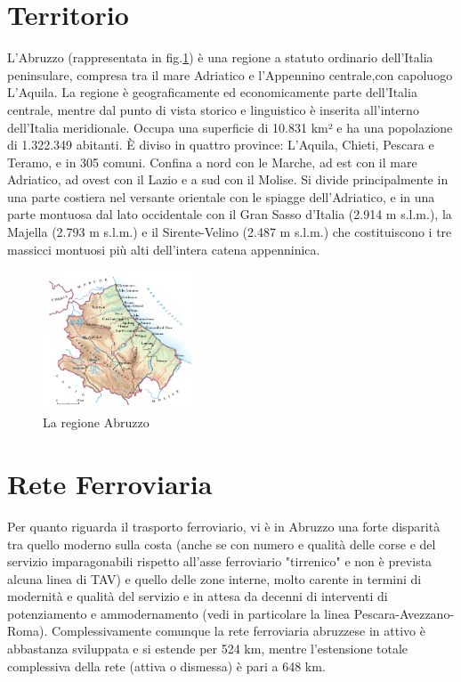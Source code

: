 \section{Territorio}
L'Abruzzo (rappresentata in fig.\ref{fig:regioneAbruzzo}) è una regione a statuto ordinario dell'Italia peninsulare, compresa tra il mare Adriatico e l'Appennino centrale,con capoluogo L'Aquila. La regione è geograficamente ed economicamente parte dell'Italia centrale, mentre dal punto di vista storico e linguistico è inserita all'interno dell'Italia meridionale.
\newline
Occupa una superficie di 10.831 km² e ha una popolazione di 1.322.349 abitanti. È diviso in quattro province: L'Aquila, Chieti, Pescara e Teramo, e in 305 comuni. Confina a nord con le Marche, ad est con il mare Adriatico, ad ovest con il Lazio e a sud con il Molise. Si divide principalmente in una parte costiera nel versante orientale con le spiagge dell'Adriatico, e in una parte montuosa dal lato occidentale con il Gran Sasso d'Italia (2.914 m s.l.m.), la Majella (2.793 m s.l.m.) e il Sirente-Velino (2.487 m s.l.m.) che costituiscono i tre massicci montuosi più alti dell'intera catena appenninica.
\newpage
\begin{figure}[bht]
	\centering
	\includegraphics[width=0.4\textwidth]{img/regione}
	\caption{La regione Abruzzo}
    \label{fig:regioneAbruzzo}
\end{figure}

\section{Rete Ferroviaria}
Per quanto riguarda il trasporto ferroviario, vi è in Abruzzo una forte disparità tra quello moderno sulla costa (anche se con numero e qualità delle corse e del servizio imparagonabili rispetto all'asse ferroviario "tirrenico" e non è prevista alcuna linea di TAV) e quello delle zone interne, molto carente in termini di modernità e qualità del servizio e in attesa da decenni di interventi di potenziamento e ammodernamento (vedi in particolare la linea Pescara-Avezzano-Roma). Complessivamente comunque la rete ferroviaria abruzzese in attivo è abbastanza sviluppata e si estende per 524 km, mentre l'estensione totale complessiva della rete (attiva o dismessa) è pari a 648 km.


